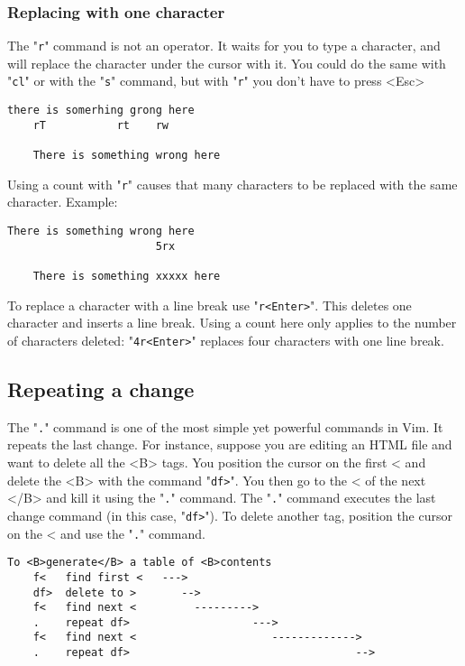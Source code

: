 \subsubsection{Replacing with one character}

The "\verb!r!" command is not an operator.
It waits for you to type a character, and will replace the character under the cursor with it.
You could do the same with "\verb!cl!" or with the "\verb!s!" command, but with "\verb!r!" you don't have to press <Esc>

\begin{Verbatim}[samepage=true]
    there is somerhing grong here 
    rT           rt    rw

    There is something wrong here 
\end{Verbatim}

Using a count with "\verb!r!" causes that many characters to be replaced with the same character.
Example:

\begin{Verbatim}[samepage=true]
    There is something wrong here 
                       5rx

    There is something xxxxx here 
\end{Verbatim}

To replace a character with a line break use "\verb!r<Enter>!".
This deletes one character and inserts a line break.
Using a count here only applies to the number of characters deleted: "\verb!4r<Enter>!" replaces four characters with one line break.

\subsection{Repeating a change}

The "\verb!.!" command is one of the most simple yet powerful commands in Vim.
It repeats the last change.
For instance, suppose you are editing an HTML file and want to delete all the <B> tags.
You position the cursor on the first < and delete the <B> with the command "\verb!df>!".
You then go to the < of the next </B> and kill it using the "\verb!.!" command.
The "\verb!.!" command executes the last change command (in this case, "\verb!df>!").
To delete another tag, position the cursor on the < and use the "\verb!.!" command.

\begin{Verbatim}[samepage=true]
                        To <B>generate</B> a table of <B>contents 
    f<   find first <   --->
    df>  delete to >       -->
    f<   find next <         --------->
    .    repeat df>                   --->
    f<   find next <                     ------------->
    .    repeat df>                                   -->
\end{Verbatim}

